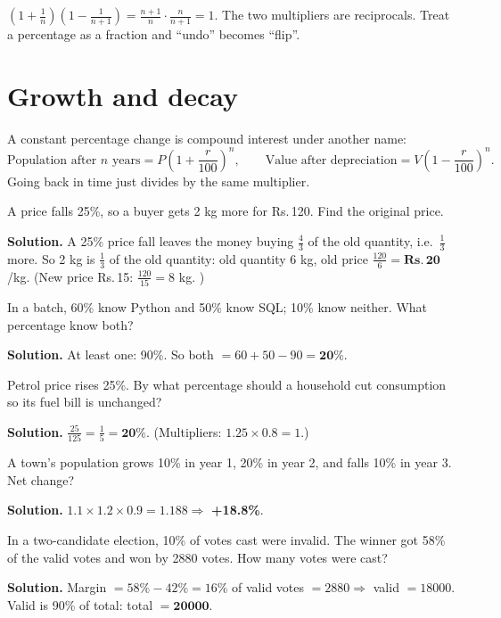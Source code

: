 \documentclass[11pt,a4paper,openany]{report}
\newcommand{\Rs}{Rs.\,}
\begin{document}
\begin{why}
$\left(1+\frac1n\right)\left(1-\frac1{n+1}\right)=\frac{n+1}{n}\cdot\frac{n}{n+1}=1$. The two multipliers are reciprocals. Treat a percentage as a fraction and ``undo'' becomes ``flip''.
\end{why}

\section{Growth and decay}
A constant percentage change is compound interest under another name:
\[\text{Population after }n\text{ years}=P\left(1+\frac r{100}\right)^n,\qquad\text{Value after depreciation}=V\left(1-\frac r{100}\right)^n.\]
Going back in time just divides by the same multiplier.

\begin{example}
A price falls 25\%, so a buyer gets 2 kg more for \Rs120. Find the original price.

\textbf{Solution.} A 25\% price fall leaves the money buying $\frac43$ of the old quantity, i.e.\ $\frac13$ more. So 2 kg is $\frac13$ of the old quantity: old quantity 6 kg, old price $\frac{120}6=\mathbf{\Rs20}$/kg. (New price \Rs15: $\frac{120}{15}=8$ kg. \checkmark)
\end{example}

\begin{example}
In a batch, 60\% know Python and 50\% know SQL; 10\% know neither. What percentage know both?

\textbf{Solution.} At least one: 90\%. So both $=60+50-90=\mathbf{20\%}$.
\end{example}

\begin{example}
Petrol price rises 25\%. By what percentage should a household cut consumption so its fuel bill is unchanged?

\textbf{Solution.} $\frac{25}{125}=\frac15=\mathbf{20\%}$. (Multipliers: $1.25\times0.8=1$.)
\end{example}

\begin{example}
A town's population grows 10\% in year 1, 20\% in year 2, and falls 10\% in year 3. Net change?

\textbf{Solution.} $1.1\times1.2\times0.9=1.188\Rightarrow$ \textbf{+18.8\%}.
\end{example}

\begin{example}[elections]
In a two-candidate election, 10\% of votes cast were invalid. The winner got 58\% of the valid votes and won by
2880 votes. How many votes were cast?

\textbf{Solution.} Margin $=58\%-42\%=16\%$ of valid votes $=2880\Rightarrow$ valid $=18000$. Valid is 90\% of total:
total $=\mathbf{20000}$.
\end{example}
\end{document}
